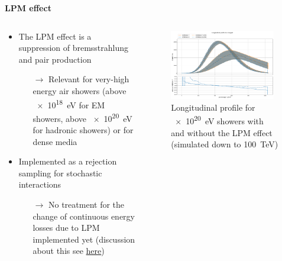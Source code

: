 \documentclass[aspectratio=1610, 9pt]{beamer}
\begin{document}
\begin{frame}

\textbf{LPM effect}

    \begin{columns}[onlytextwidth]
        \begin{column}{0.45\textwidth}
            \begin{itemize}
              \item The LPM effect is a suppression of bremsstrahlung and pair production
              \begin{itemize}
                \item[$\rightarrow$] Relevant for very-high energy air showers (above \SI{e18}{\electronvolt} for EM showers, above \SI{e20}{\electronvolt} for hadronic showers\footnotemark) or for dense media
              \end{itemize}
              \item Implemented as a rejection sampling for stochastic interactions
              \begin{itemize}
                \item[$\rightarrow$] No treatment for the change of continuous energy losses due to LPM implemented yet (discussion about this see \href{https://indico.scc.kit.edu/event/2580/contributions/9629/attachments/4716/7107/lpm_effect.pdf}{here})
              \end{itemize}
            \end{itemize}
        \end{column}
        \begin{column}{0.55\textwidth}
            \begin{figure}
                \centering
                \includegraphics[width=0.95\textwidth]{plots/long_charged_LPM.png}
                \caption{Longitudinal profile for \SI{e20}{\electronvolt} showers with and without the LPM effect (simulated down to \SI{100}{\tera\electronvolt})}
            \end{figure}
        \end{column}
    \end{columns}
\end{frame}
\end{document}
